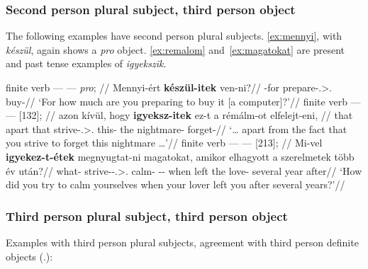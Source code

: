 \subsubsection{Second person plural subject, third person object}\label{sub:2pl-3}

The following examples have second person plural subjects. \eqref{ex:mennyi},
with \emph{készül}, again shows a \emph{pro} object. \eqref{ex:remalom}
and~\eqref{ex:magatokat} are present and past tense examples of
\emph{igyekszik}.

\ex\label{ex:mennyi}%
    \begingl
        \glpreamble finite verb --- \Inf{} --- \emph{pro}; //
        \gla 	Mennyi-ért \textbf{készül-itek} ven-ni?//
        -for prepare-\Spl.\Sbj>\Third.\Obj{} buy-\Inf{}//
        \glft 	\enquote*{For how much are you preparing to buy it [a computer]?}\trailingcitation{}//
    \endgl
\xe
\ex\label{ex:remalom}%
    \begingl
        \glpreamble finite verb --- \Obj{} --- \Inf{} [132]; //
        \gla 	\nogloss{\dots} azon kívül, hogy \textbf{igyeksz-itek} ez-t a rémálm-ot elfelejt-eni, \nogloss{\dots}//
        \glb 	that apart that strive-\Spl.\Sbj>\Third.\Obj{} this-\Acc{} the nightmare-\Acc{} forget-\Inf//
        \glft 	\enquote*{\dots{} apart from the fact that you strive to forget this nightmare \dots{}}\trailingcitation{}//
    \endgl
\xe
\ex\label{ex:magatokat}%
    \begingl
    \glpreamble finite verb --- \Inf{} --- \Obj{} [213]; //
        \gla 	Mi-vel \textbf{igyekez-t-étek} megnyugtat-ni magatokat, amikor elhagyott a szerelmetek több év után?//
        \glb 	what-\Com{} strive-\Pst-\Tsg.\Sbj>\Third.\Obj{} calm-\Inf{} \Refl-\Tpl-\Acc{} when left the love-\Tpl{} several year after//
        \glft 	\enquote*{How did you try to calm yourselves when your lover left you after several years?}\trailingcitation{}//
    \endgl
\xe

\subsubsection{Third person plural subject, third person object}\label{sub:3pl-3}

Examples with third person plural subjects, agreement with third person
definite objects (\Tpl.\Obj):


